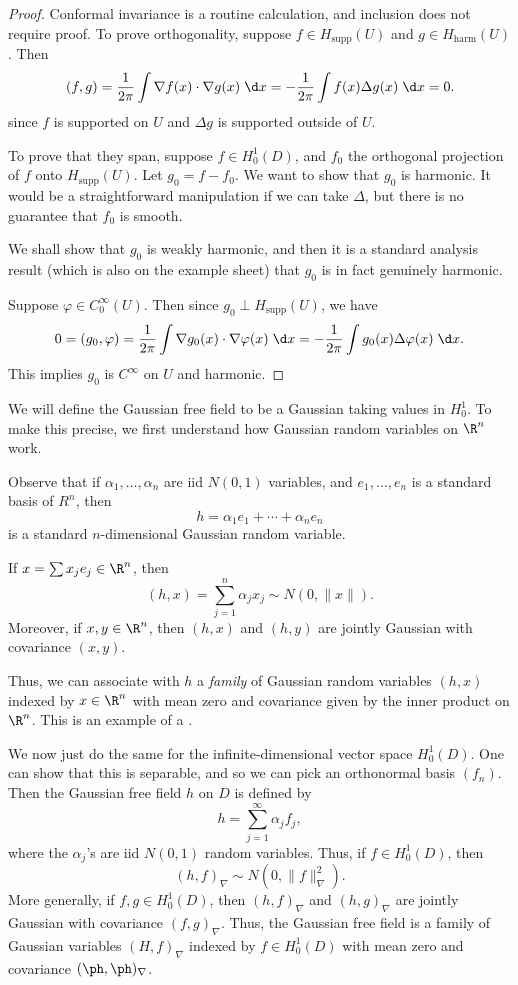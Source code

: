 \documentclass[a4paper]{article}
\begin{document}
\begin{proof}
  Conformal invariance is a routine calculation, and inclusion does not require proof. To prove orthogonality, suppose $f \in H_{\mathrm{supp}}(U)$ and $g \in H_{\mathrm{harm}}(U)$. Then
  \[
    (f, g) = \frac{1}{2\pi} \int \nabla f(x) \cdot \nabla g(x) \;\d x =- \frac{1}{2\pi} \int f(x) \Delta g(x)\;\d x = 0.
  \]
  since $f$ is supported on $U$ and $\Delta g$ is supported outside of $U$.

  To prove that they span, suppose $f \in H_0^1(D)$, and $f_0$ the orthogonal projection of $f$ onto $H_{\mathrm{supp}}(U)$. Let $g_0 = f - f_0$. We want to show that $g_0$ is harmonic. It would be a straightforward manipulation if we can take $\Delta$, but there is no guarantee that $f_0$ is smooth.

  We shall show that $g_0$ is weakly harmonic, and then it is a standard analysis result (which is also on the example sheet) that $g_0$ is in fact genuinely harmonic.

  Suppose $\varphi \in C_0^\infty(U)$. Then since $g_0 \perp H_{\mathrm{supp}}(U)$, we have
  \[
    0 = (g_0, \varphi) = \frac{1}{2\pi} \int \nabla g_0(x) \cdot \nabla \varphi(x)\;\d x = - \frac{1}{2\pi} \int g_0(x) \Delta \varphi(x)\;\d x.
  \]
  This implies $g_0$ is $C^\infty$ on $U$ and harmonic.
\end{proof}

We will define the Gaussian free field to be a Gaussian taking values in $H_0^1$. To make this precise, we first understand how Gaussian random variables on $\R^n$ work.

Observe that if $\alpha_1, \ldots, \alpha_n$ are iid $N(0, 1)$ variables, and $e_1, \ldots, e_n$ is a standard basis of $R^n$, then
\[
  h = \alpha_1 e_1 + \cdots + \alpha_n e_n
\]
is a standard $n$-dimensional Gaussian random variable.

If $x = \sum x_j e_j \in \R^n$, then
\[
  (h, x) = \sum_{j = 1}^n \alpha_j x_j \sim N(0, \|x\|).
\]
Moreover, if $x, y \in \R^n$, then $(h, x)$ and $(h, y)$ are jointly Gaussian with covariance $(x, y)$.

Thus, we can associate with $h$ a \emph{family} of Gaussian random variables $(h, x)$ indexed by $x \in \R^n$ with mean zero and covariance given by the inner product on $\R^n$. This is an example of a .

We now just do the same for the infinite-dimensional vector space $H_0^1(D)$. One can show that this is separable, and so we can pick an orthonormal basis $(f_n)$. Then the Gaussian free field $h$ on $D$ is defined by
\[
  h = \sum_{j = 1}^\infty \alpha_j f_j,
\]
where the $\alpha_j$'s are iid $N(0, 1)$ random variables. Thus, if $f \in H_0^1(D)$, then
\[
  (h, f)_\nabla \sim N(0, \|f\|_\nabla^2).
\]
More generally, if $f, g \in H_0^1(D)$, then $(h, f)_\nabla$ and $(h, g)_\nabla$ are jointly Gaussian with covariance $(f, g)_\nabla$. Thus, the Gaussian free field is a family of Gaussian variables $(H, f)_\nabla$ indexed by $f \in H_0^1(D)$ with mean zero and covariance $(\ph, \ph)_\nabla$.
\end{document}

